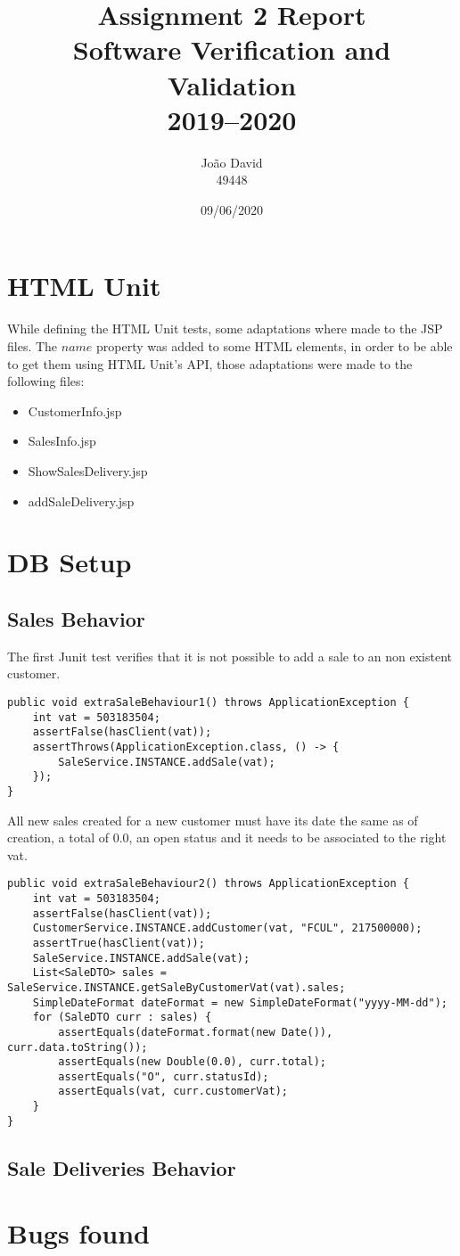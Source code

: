 \documentclass[12pt]{article}
\title{Assignment 2 Report \\
  \Large Software Verification and Validation \\ 2019--2020
}
\author{
  João David\\49448
}
\date{09/06/2020}
\begin{document}
\maketitle

\section{HTML Unit}
While defining the HTML Unit tests, some adaptations where made to the JSP files. The $name$ property was added to some HTML elements, in order to be able to get them using HTML Unit's API, those adaptations were made to the following files:

\begin{itemize}
   \item  CustomerInfo.jsp
   
   \item  SalesInfo.jsp
   
   \item  ShowSalesDelivery.jsp
   
   \item  addSaleDelivery.jsp  
\end{itemize}

\newpage

\section{DB Setup}
\subsection{Sales Behavior}
The first Junit test verifies that it is not possible to add a sale to an non existent customer. 
\begin{lstlisting}
public void extraSaleBehaviour1() throws ApplicationException {
	int vat = 503183504;
	assertFalse(hasClient(vat));
	assertThrows(ApplicationException.class, () -> {
		SaleService.INSTANCE.addSale(vat);
	});	
}	
\end{lstlisting}

All new sales created for a new customer must have its date the same as of creation, a total of 0.0, an open status and it needs to be associated to the right vat.
\begin{lstlisting}
public void extraSaleBehaviour2() throws ApplicationException {
	int vat = 503183504;
	assertFalse(hasClient(vat));
	CustomerService.INSTANCE.addCustomer(vat, "FCUL", 217500000);
	assertTrue(hasClient(vat));
	SaleService.INSTANCE.addSale(vat);
	List<SaleDTO> sales = SaleService.INSTANCE.getSaleByCustomerVat(vat).sales;
	SimpleDateFormat dateFormat = new SimpleDateFormat("yyyy-MM-dd");
	for (SaleDTO curr : sales) {
		assertEquals(dateFormat.format(new Date()), curr.data.toString());
		assertEquals(new Double(0.0), curr.total);
		assertEquals("O", curr.statusId);
		assertEquals(vat, curr.customerVat);
	}		
}
\end{lstlisting}
\subsection{Sale Deliveries Behavior}

\section{Bugs found}










\end{document}
